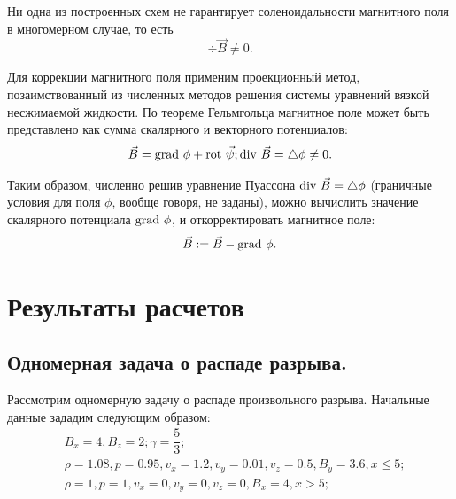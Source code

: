 \documentclass[14pt, a4paper, fleqn]{extreport}
\begin{document}
    Ни одна из построенных схем не гарантирует соленоидальности магнитного поля
    в многомерном случае, то есть
    \begin{equation*}
        \div{\vec{B}} \ne 0.
    \end{equation*}
    
    Для коррекции магнитного поля применим проекционный метод, 
    позаимствованный из численных методов решения системы уравнений вязкой 
    несжимаемой жидкости. 
    По теореме Гельмгольца магнитное поле может быть представлено как
    сумма скалярного и векторного потенциалов:
    \begin{equation*}
        \vec{B} = \text{grad }{\phi} + \text{rot }{\vec{\psi}}; 
        \text{div }{\vec{B}} = \mathop{}\!\mathbin\bigtriangleup{\phi} \ne 0.
    \end{equation*}
    
    Таким образом, численно решив уравнение Пуассона 
    $\text{div }{\vec{B}} = \mathop{}\!\mathbin\bigtriangleup{\phi}$ 
    (граничные условия для поля $\phi$, вообще говоря, не заданы), 
    можно вычислить значение скалярного потенциала $\text{grad }{\phi}$,
    и откорректировать магнитное поле:
    \begin{equation*}
        \vec{B} := \vec{B} - \text{grad }{\phi}.
    \end{equation*}
    
    \section{Результаты расчетов}
    
    \subsection{Одномерная задача о распаде разрыва.}
    
    Рассмотрим одномерную задачу о распаде произвольного 
    разрыва.
    Начальные данные зададим следующим образом:
    \begin{equation*}
    \begin{split}
        &B_x = 4, B_z = 2; \gamma = \dfrac{5}{3}; \\
        &\rho = 1.08, p = 0.95, v_x = 1.2, v_y = 0.01, v_z = 0.5, 
                                B_y = 3.6, x \le 5; \\
        &\rho = 1, p = 1, v_x = 0, v_y = 0, v_z = 0,
                          B_x = 4, x > 5;
    \end{split}
    \end{equation*}
    
\end{document}

